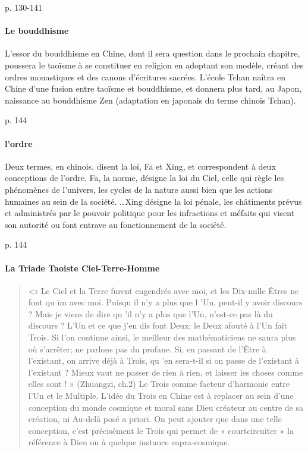 \cite{PolDroit:voyage} p. 130-141 




\paragraph{Le bouddhisme} L’essor du bouddhisme en Chine, dont il sera question dans le prochain chapitre, poussera le taoïsme à se constituer en religion en adoptant son modèle, créant des ordres monastiques et des canons d’écritures sacrées. L’école Tchan naîtra en Chine d’une fusion entre taoïsme et bouddhisme, et donnera plus tard, au Japon, naissance au bouddhisme Zen (adaptation en japonais du terme chinois Tchan).

\cite{PolDroit:voyage} p. 144 


\paragraph{l'ordre} Deux termes, en chinois, disent la loi, Fa et Xing, et correspondent à deux conceptions de l’ordre. Fa, la norme, désigne la loi du Ciel, celle qui règle les phénomènes de l’univers, les cycles de la nature aussi bien que les actions humaines au sein de la société. \ldots Xing désigne la loi pénale, les châtiments prévus et administrés par le pouvoir politique pour les infractions et méfaits qui visent son autorité ou font entrave au fonctionnement de la société.



\cite{PolDroit:voyage} p. 144 

\paragraph{La Triade Taoiste Ciel-Terre-Homme}
\begin{quote}
<r Le Ciel et la Terre furent engendrés avec moi, et les Dix-mille
Êtres ne font qu ïm avec moi. Puisqu il n'y a plus que l 'Un, peut-il
y avoir discours ? Mais je viens de dire qu 'il n'y a plus que l'Un,
n'est-ce pas là du discours ? L'Un et ce que j'en dis font Deux;
le Deux afouté à l'Un fait Trois. Si l'on continue ainsi, le meilleur
des mathématiciens ne saura plus où s'arrêter; ne parlons pas du
profane. Si, en passant de l'Être à l'existant, on arrive déjà à Trois,
qu 'en sera-t-il si on passe de l'existant à l'existant ? Mieux vaut ne
passer de rien à rien, et laisser les choses comme elles sont ! »
(Zhuangzi, ch.2)
Le Trois comme facteur d'harmonie entre l'Un et le Multiple. L'idée du Trois en Chine est à replacer au sein d'une conception
du monde cosmique et moral sans Dieu créateur au centre de sa
création, ni Au-delà posé a priori. On peut ajouter que dans une
telle conception, c'est précisément le Trois qui permet de « courtcircuiter
» la référence à Dieu ou à quelque instance supra-cosmique. 
\end{quote}

